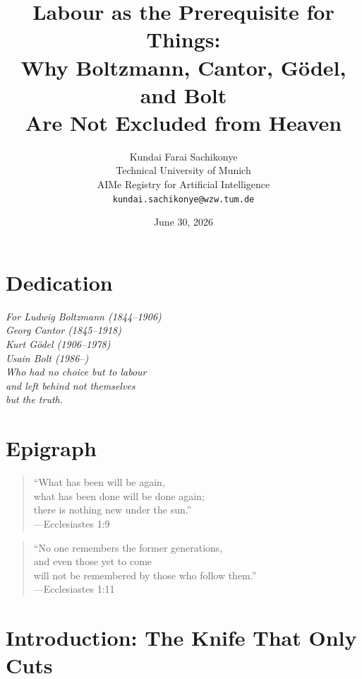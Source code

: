\documentclass[11pt,a4paper]{article}
\title{\textbf{Labour as the Prerequisite for Things:\\[3pt]
Why Boltzmann, Cantor, Gödel, and Bolt\\
Are Not Excluded from Heaven}}
\author{%
Kundai Farai Sachikonye\\
\small Technical University of Munich\\
\small AIMe Registry for Artificial Intelligence\\
\small \texttt{kundai.sachikonye@wzw.tum.de}}
\date{June 30, 2026}
\begin{document}
\maketitle

\section*{Dedication}

\begin{center}
\textit{For Ludwig Boltzmann (1844--1906)\\
Georg Cantor (1845--1918)\\
Kurt Gödel (1906--1978)\\
Usain Bolt (1986--)\\[1em]
Who had no choice but to labour\\
and left behind not themselves\\
but the truth.}
\end{center}

\section*{Epigraph}

\begin{quote}
``What has been will be again,\\
what has been done will be done again;\\
there is nothing new under the sun.''\\
\hfill---Ecclesiastes 1:9
\end{quote}

\begin{quote}
``No one remembers the former generations,\\
and even those yet to come\\
will not be remembered by those who follow them.''\\
\hfill---Ecclesiastes 1:11
\end{quote}

\section{Introduction: The Knife That Only Cuts}
\label{sec:intro}
\end{document}
